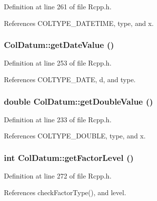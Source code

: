 Definition at line 261 of file Rcpp.h.

References COLTYPE\_\-DATETIME, type, and x.\hypertarget{classColDatum_a70480f53f9cee46bcdaed7331e38c943}{
\subsubsection[{getDateValue}]{ ColDatum::getDateValue ()}}
\label{classColDatum_a70480f53f9cee46bcdaed7331e38c943}


Definition at line 253 of file Rcpp.h.

References COLTYPE\_\-DATE, d, and type.\hypertarget{classColDatum_a6a19044be8ade2b14b372b179210a9bd}{
\subsubsection[{getDoubleValue}]{\setlength{\rightskip}{0pt plus 5cm}double ColDatum::getDoubleValue ()}}
\label{classColDatum_a6a19044be8ade2b14b372b179210a9bd}


Definition at line 233 of file Rcpp.h.

References COLTYPE\_\-DOUBLE, type, and x.\hypertarget{classColDatum_adf3716db9f3483f3cd255a4c05823479}{
\subsubsection[{getFactorLevel}]{\setlength{\rightskip}{0pt plus 5cm}int ColDatum::getFactorLevel ()}}
\label{classColDatum_adf3716db9f3483f3cd255a4c05823479}


Definition at line 272 of file Rcpp.h.

References checkFactorType(), and level.

